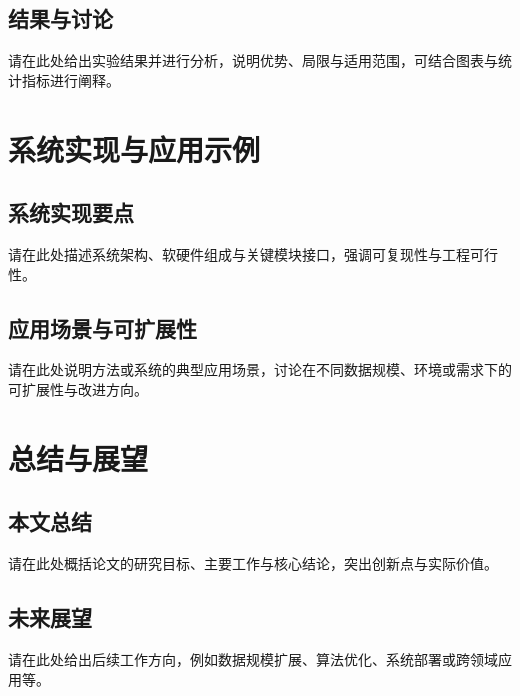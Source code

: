 \documentclass[unicode,master,submission,final]{scutthesis}
\begin{document}
\section{结果与讨论}

请在此处给出实验结果并进行分析，说明优势、局限与适用范围，可结合图表与统计指标进行阐释。

\chapter{系统实现与应用示例}

\section{系统实现要点}

请在此处描述系统架构、软硬件组成与关键模块接口，强调可复现性与工程可行性。

\section{应用场景与可扩展性}

请在此处说明方法或系统的典型应用场景，讨论在不同数据规模、环境或需求下的可扩展性与改进方向。

\backmatter
\renewcommand{\chaptermark}[1]{\markboth{#1}{}}

\chapter{总结与展望}

\section*{本文总结}
{} %

请在此处概括论文的研究目标、主要工作与核心结论，突出创新点与实际价值。

\section*{未来展望}
{}

请在此处给出后续工作方向，例如数据规模扩展、算法优化、系统部署或跨领域应用等。
\end{document}
